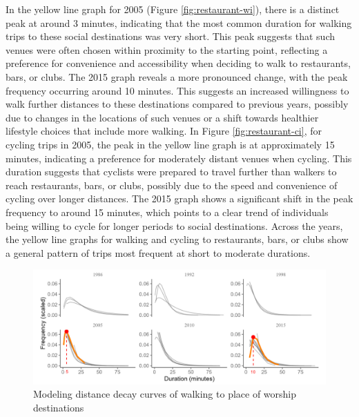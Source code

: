 \documentclass[
11pt, %
oneside, %
english, %
singlespacing, %
]{macthesis} %
\begin{document}
In the yellow line graph for 2005 (Figure \ref{fig:restaurant-wi}), there is a distinct peak at around 3 minutes, indicating that the most common duration for walking trips to these social destinations was very short. This peak suggests that such venues were often chosen within proximity to the starting point, reflecting a preference for convenience and accessibility when deciding to walk to restaurants, bars, or clubs. The 2015 graph reveals a more pronounced change, with the peak frequency occurring around 10 minutes. This suggests an increased willingness to walk further distances to these destinations compared to previous years, possibly due to changes in the locations of such venues or a shift towards healthier lifestyle choices that include more walking. In Figure \ref{fig:restaurant-ci}, for cycling trips in 2005, the peak in the yellow line graph is at approximately 15 minutes, indicating a preference for moderately distant venues when cycling. This duration suggests that cyclists were prepared to travel further than walkers to reach restaurants, bars, or clubs, possibly due to the speed and convenience of cycling over longer distances. The 2015 graph shows a significant shift in the peak frequency to around 15 minutes, which points to a clear trend of individuals being willing to cycle for longer periods to social destinations. Across the years, the yellow line graphs for walking and cycling to restaurants, bars, or clubs show a general pattern of trips most frequent at short to moderate durations.

\newpage
\thispagestyle{empty}
\begin{landscape}

\begin{figure}

{\centering \includegraphics[width=0.9\linewidth]{figure/ch03-Fig15} 

}

\caption{Modeling distance decay curves of walking to place of worship destinations}\label{fig:place-wi}
\end{figure}

\end{landscape}
\clearpage
\end{document}
